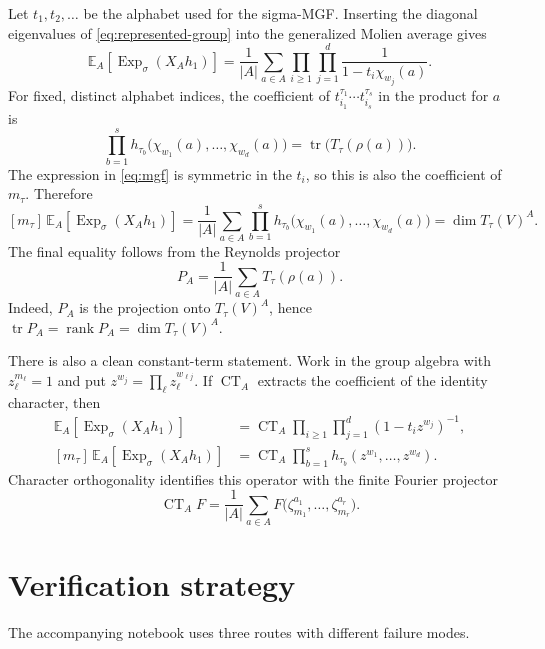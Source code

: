 \documentclass[11pt]{article}
\newcommand{\CT}{\operatorname{CT}}
\newcommand{\Exp}{\operatorname{Exp}}
\begin{document}
Let $t_1,t_2,\ldots$ be the alphabet used for the sigma-MGF.  Inserting the
diagonal eigenvalues of \eqref{eq:represented-group} into the generalized
Molien average gives
\begin{equation}\label{eq:mgf}
 \mathbb E_A\!\left[\Exp_\sigma(X_Ah_1)\right]
 =\frac1{|A|}\sum_{a\in A}
 \prod_{i\ge1}\prod_{j=1}^{d}
 \frac{1}{1-t_i\chi_{w_j}(a)}.
\end{equation}
For fixed, distinct alphabet indices, the coefficient of
$t_{i_1}^{\tau_1}\cdots t_{i_s}^{\tau_s}$ in the product for $a$ is
\[
 \prod_{b=1}^{s}h_{\tau_b}
 \bigl(\chi_{w_1}(a),\ldots,\chi_{w_d}(a)\bigr)
 =\operatorname{tr}\bigl(T_\tau(\rho(a))\bigr).
\]
The expression in \eqref{eq:mgf} is symmetric in the $t_i$, so this is also
the coefficient of $m_\tau$.  Therefore
\begin{equation}\label{eq:molien-coefficient}
 [m_\tau]\,\mathbb E_A\!\left[\Exp_\sigma(X_Ah_1)\right]
 =\frac1{|A|}\sum_{a\in A}
 \prod_{b=1}^{s}h_{\tau_b}
 \bigl(\chi_{w_1}(a),\ldots,\chi_{w_d}(a)\bigr)
 =\dim T_\tau(V)^A.
\end{equation}
The final equality follows from the Reynolds projector
\[
 P_A=\frac1{|A|}\sum_{a\in A}T_\tau(\rho(a)).
\]
Indeed, $P_A$ is the projection onto $T_\tau(V)^A$, hence
$\operatorname{tr}P_A=\operatorname{rank}P_A=\dim T_\tau(V)^A$.

There is also a clean constant-term statement.  Work in the group algebra
with $z_\ell^{m_\ell}=1$ and put
$z^{w_j}=\prod_\ell z_\ell^{w_{\ell j}}$.  If $\CT_A$ extracts the coefficient
of the identity character, then
\begin{align}
 \mathbb E_A\!\left[\Exp_\sigma(X_Ah_1)\right]
 &=\CT_A\prod_{i\ge1}\prod_{j=1}^{d}(1-t_i z^{w_j})^{-1},\\
 [m_\tau]\,\mathbb E_A\!\left[\Exp_\sigma(X_Ah_1)\right]
 &=\CT_A\prod_{b=1}^{s}h_{\tau_b}
 (z^{w_1},\ldots,z^{w_d}).
\end{align}
Character orthogonality identifies this operator with the finite Fourier
projector
\[
 \CT_A F=\frac1{|A|}\sum_{a\in A}
 F\bigl(\zeta_{m_1}^{a_1},\ldots,\zeta_{m_r}^{a_r}\bigr).
\]

\section{Verification strategy}

The accompanying notebook uses three routes with different failure modes.
\end{document}
